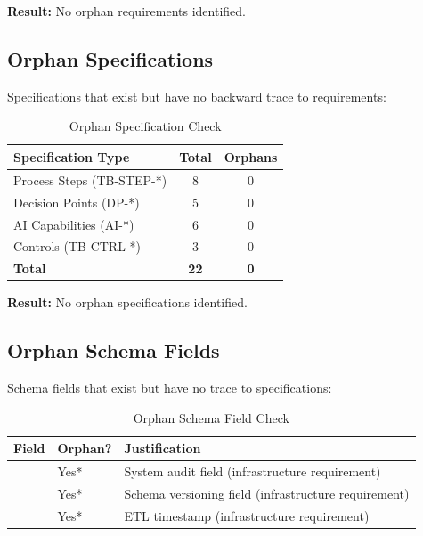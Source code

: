 \textcolor{sourcegreen}{\textbf{Result:}} No orphan requirements identified.

\subsection{Orphan Specifications}

Specifications that exist but have no backward trace to requirements:

\begin{table}[h]
\centering
\caption{Orphan Specification Check}
\label{tab:orphan-specifications}
\begin{tabular}{@{}lcc@{}}
\toprule
\textbf{Specification Type} & \textbf{Total} & \textbf{Orphans} \\
\midrule
Process Steps (TB-STEP-*) & 8 & 0 \\
Decision Points (DP-*) & 5 & 0 \\
AI Capabilities (AI-*) & 6 & 0 \\
Controls (TB-CTRL-*) & 3 & 0 \\
\midrule
\textbf{Total} & \textbf{22} & \textbf{0} \\
\bottomrule
\end{tabular}
\end{table}

\textcolor{sourcegreen}{\textbf{Result:}} No orphan specifications identified.

\subsection{Orphan Schema Fields}

Schema fields that exist but have no trace to specifications:

\begin{table}[h]
\centering
\caption{Orphan Schema Field Check}
\label{tab:orphan-schema-fields}
\begin{tabular}{@{}L{5cm}C{2cm}L{6.5cm}@{}}
\toprule
\textbf{Field} & \textbf{Orphan?} & \textbf{Justification} \\
\midrule
{} & Yes* & System audit field (infrastructure requirement) \\
 & Yes* & Schema versioning field (infrastructure requirement) \\
 & Yes* & ETL timestamp (infrastructure requirement) \\
\bottomrule
\end{tabular}
\end{table}

